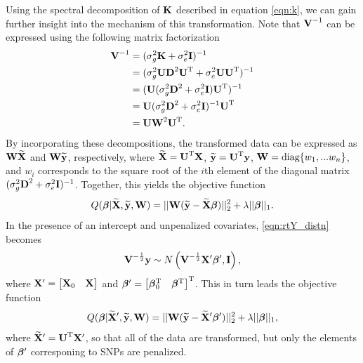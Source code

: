 Using the spectral decomposition of $\textbf{K}$ described in equation \eqref{eqn:k}, we can gain further insight into the mechanism of this transformation. Note that $\textbf{V}^{-1}$ can be expressed using the following matrix factorization 
\begin{align*}
    \textbf{V}^{-1} &= (\sigma^2_g \textbf{K} + \sigma^2_e \textbf{I})^{-1}\\
    &=(\sigma^2_g \textbf{U} \textbf{D}^2 \textbf{U}^{\text{T}} + \sigma^2_e \textbf{U} \textbf{U}^{\text{T}})^{-1}\\
    &= (\textbf{U} (\sigma^2_g \textbf{D}^2 + \sigma^2_e \textbf{I}) \textbf{U}^{\text{T}})^{-1}\\
    &=\textbf{U} (\sigma^2_g \textbf{D}^2 + \sigma^2_e \textbf{I})^{-1} \textbf{U}^{\text{T}}\\
    &=\textbf{U} \textbf{W}^2 \textbf{U}^{\text{T}}.
\end{align*}
By incorporating these decompositions, the transformed data can be expressed as $\textbf{W} \widetilde{\textbf{X}{}}$ and $\textbf{W} \widetilde{\textbf{y}}$, respectively, where $\widetilde{\textbf{X}{}} = \textbf{U}^{\text{T}} \textbf{X}$, $\widetilde{\textbf{y}} = \textbf{U}^{\text{T}} \textbf{y}$, $\textbf{W} = \text{diag}\{w_1, ... w_n\}$, and $w_i$ corresponds to the square root of the $i$th element of the diagonal matrix $(\sigma^2_g \textbf{D}^2 + \sigma^2_e \textbf{I})^{-1}$. Together, this yields the objective function
\begin{equation}
\label{eqn:lmm_obj}
Q(\boldsymbol{\beta}{} | \widetilde{\textbf{X}{}}, \widetilde{\textbf{y}}, \textbf{W}) = || \textbf{W} (\widetilde{\textbf{y}} - \widetilde{\textbf{X}{}} \boldsymbol{\beta}{})||_2^2 + \lambda || \boldsymbol{\beta}{} ||_1.
\end{equation}
In the presence of an intercept and unpenalized covariates, \eqref{eqn:rtY_distn} becomes 
\begin{equation}
\textbf{V}^{-\frac{1}{2}}\textbf{y} \sim N\left(\textbf{V}^{-\frac{1}{2}} \textbf{X}{^\prime} \boldsymbol{\beta}{}{^\prime}, \textbf{I} \right),
\end{equation}
where $\textbf{X}{^\prime} = \begin{bmatrix} \textbf{X}_0 & \textbf{X} \end{bmatrix}$ and $\boldsymbol{\beta}{}{^\prime} = \begin{bmatrix} \boldsymbol{\beta}{}_0^{\text{T}} & \boldsymbol{\beta}{}^{\text{T}} \end{bmatrix}^{\text{T}}$. This in turn leads the objective function
\begin{equation}
Q(\boldsymbol{\beta}{} | \widetilde{\textbf{X}{}}{^\prime}, \widetilde{\textbf{y}}, \textbf{W}) = || \textbf{W} (\widetilde{\textbf{y}} - \widetilde{\textbf{X}{}}{^\prime} \boldsymbol{\beta}{}{^\prime})||_2^2 + \lambda || \boldsymbol{\beta}{} ||_1,
\end{equation}
where $\widetilde{\textbf{X}{}}{^\prime} = \textbf{U}^{\text{T}} \textbf{X}{^\prime}$, so that all of the data are transformed, but only the elements of $\boldsymbol{\beta}{}{^\prime}$ corresponing to SNPs are penalized. 


